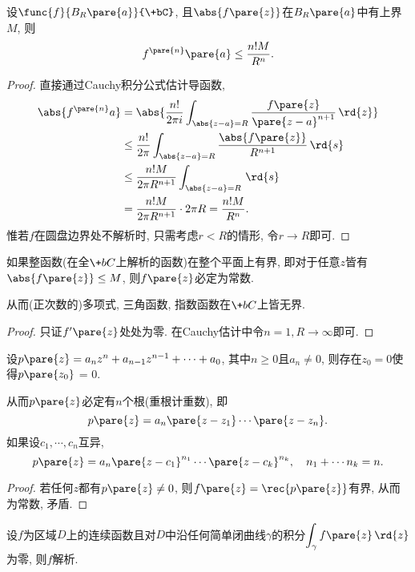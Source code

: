 \documentclass{ctexart}
\begin{document}
\begin{ex}[Cauchy估计]
    设$\func{f}{B_R\pare{a}}{\+bC}$, 且$\abs{f\pare{z}}$在$B_R\pare{a}$中有上界$M$, 则
    \[ f^{\pare{n}}\pare{a} \le \frac{n!M}{R^n}. \]
\end{ex}
\begin{proof}
    直接通过Cauchy积分公式估计导函数,
    \begin{align*}
        \abs{f^{\pare{n}}a} &= \abs{\frac{n!}{2\pi i} \int_{\abs{z-a}=R} \frac{f\pare{z}}{\pare{z-a}^{n+1}}\,\rd{z}} \\
        &\le \frac{n!}{2\pi} \int_{\abs{z-a}=R} \frac{\abs{f\pare{z}}}{R^{n+1}}\,\rd{s} \\
        &\le \frac{n!M}{2\pi R^{n+1}} \int_{\abs{z-a}=R}\,\rd{s}\\
        &= \frac{n!M}{2\pi R^{n+1}}\cdot 2\pi R = \frac{n!M}{R^n}.
    \end{align*}
    惟若$f$在圆盘边界处不解析时, 只需考虑$r<R$的情形, 令$r\rightarrow R$即可.
\end{proof}
\begin{theorem}[Liouville定理]
    如果整函数(在全$\+bC$上解析的函数)在整个平面上有界, 即对于任意$z$皆有$\abs{f\pare{z}}\le M$, 则$f\pare{z}$必定为常数.
\end{theorem}
\begin{remark}
    从而(正次数的)多项式, 三角函数, 指数函数在$\+bC$上皆无界.
\end{remark}
\begin{proof}
    只证$f'\pare{z}$处处为零. 在Cauchy估计中令$n=1, R\rightarrow\infty$即可.
\end{proof}
\begin{theorem}[代数基本定理]
    设$p\pare{z} = a_nz^n + a_{n-1}z^{n-1} + \cdots + a_0$, 其中$n\ge 0$且$a_n\neq 0$, 则存在$z_0 = 0$使得$p\pare{z_0}$ = 0.
\end{theorem}
\begin{remark}
    从而$p\pare{z}$必定有$n$个根(重根计重数), 即
    \[ p\pare{z} = a_n \pare{z-z_1}\cdots \pare{z-z_n}. \]
    如果设$c_1,\cdots,c_n$互异,
    \[ p\pare{z} = a_n\pare{z-c_1}^{n_1}\cdots\pare{z-c_k}^{n_k},\quad n_1 + \cdots n_k = n. \]
\end{remark}
\begin{proof}
    若任何$z$都有$p\pare{z}\neq 0$, 则$f\pare{z} = \displaystyle \rec{p\pare{z}}$有界, 从而为常数, 矛盾.
\end{proof}
\begin{theorem}[Morera定理]
    设$f$为区域$D$上的连续函数且对$D$中沿任何简单闭曲线$\gamma$的积分$\displaystyle \int_\gamma f\pare{z}\,\rd{z}$为零, 则$f$解析.
\end{theorem}
\end{document}
